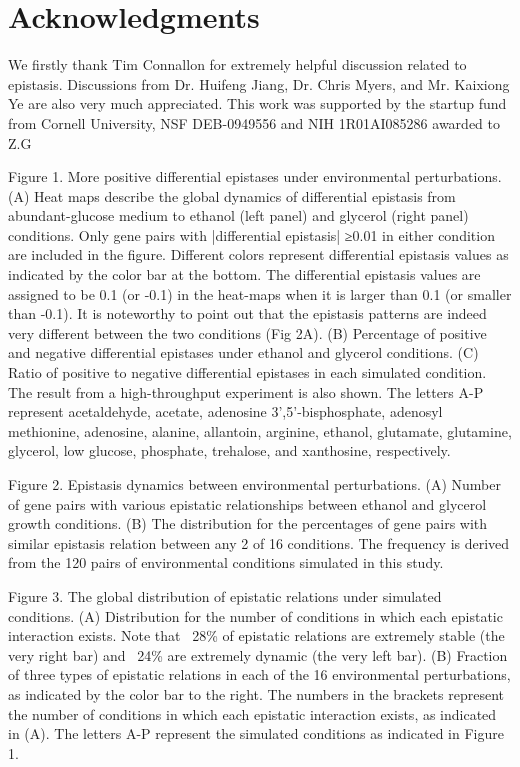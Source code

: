 \section{Acknowledgments}

We firstly thank Tim Connallon for extremely helpful discussion
related to epistasis. Discussions from Dr. Huifeng Jiang, Dr. Chris
Myers, and Mr. Kaixiong Ye are also very much appreciated. This work
was supported by the startup fund from Cornell University, NSF
DEB-0949556 and NIH 1R01AI085286 awarded to Z.G



Figure 1. More positive differential epistases under environmental
perturbations. (A) Heat maps describe the global dynamics of
differential epistasis from abundant-glucose medium to ethanol (left
panel) and glycerol (right panel) conditions. Only gene pairs with
|differential epistasis| ≥0.01 in either condition are included in the
figure. Different colors represent differential epistasis values as
indicated by the color bar at the bottom. The differential epistasis
values are assigned to be 0.1 (or -0.1) in the heat-maps when it is
larger than 0.1 (or smaller than -0.1). It is noteworthy to point out
that the epistasis patterns are indeed very different between the two
conditions (Fig 2A). (B) Percentage of positive and negative
differential epistases under ethanol and glycerol conditions. (C)
Ratio of positive to negative differential epistases in each simulated
condition. The result from a high-throughput experiment is also
shown. The letters A-P represent acetaldehyde, acetate, adenosine
3',5'-bisphosphate, adenosyl methionine, adenosine, alanine,
allantoin, arginine, ethanol, glutamate, glutamine, glycerol, low
glucose, phosphate, trehalose, and xanthosine, respectively.

Figure 2. Epistasis dynamics between environmental perturbations. (A)
Number of gene pairs with various epistatic relationships between
ethanol and glycerol growth conditions. (B) The distribution for the
percentages of gene pairs with similar epistasis relation between any
2 of 16 conditions. The frequency is derived from the 120 pairs of
environmental conditions simulated in this study.

Figure 3. The global distribution of epistatic relations under
simulated conditions. (A) Distribution for the number of conditions in
which each epistatic interaction exists. Note that ~28\% of epistatic
relations are extremely stable (the very right bar) and ~24\% are
extremely dynamic (the very left bar). (B) Fraction of three types of
epistatic relations in each of the 16 environmental perturbations, as
indicated by the color bar to the right. The numbers in the brackets
represent the number of conditions in which each epistatic interaction
exists, as indicated in (A). The letters A-P represent the simulated
conditions as indicated in Figure 1.

